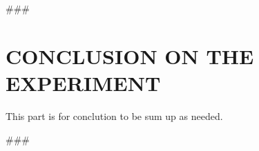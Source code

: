 
###

\section{CONCLUSION ON THE EXPERIMENT}\label{sec:conclution}
This part is for conclution to be sum up as needed.
\hfill\break
\hfill\break



###